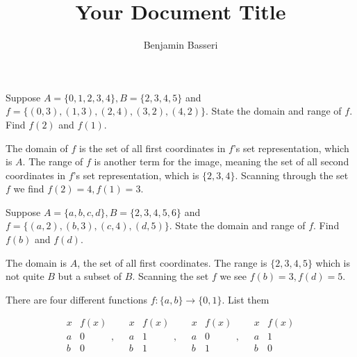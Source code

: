 \documentclass{article}
\title{Your Document Title}
\author{Benjamin Basseri}
\begin{document}
\maketitle

\begin{problem}
Suppose $A = \{0, 1, 2, 3, 4\}, B = \{2, 3, 4, 5\}$ and $f = \{(0, 3), (1, 3), (2, 4), (3, 2), (4, 2)\}$. State the domain and range of $f$. Find $f(2)$ and $f(1)$.
\end{problem}

The domain of $f$ is the set of all first coordinates in $f$'s set representation, which is $A$. The range of $f$ is another term for the image, meaning the set of all second coordinates in $f$'s set representation, which is $\{2, 3, 4\}$. Scanning through the set $f$ we find $f(2) = 4, f(1) = 3$.

\begin{problem}
Suppose $A = \{a, b, c, d\}, B = \{2, 3, 4, 5, 6\}$ and $f = \{(a, 2), (b, 3), (c, 4), (d, 5)\}$. State the domain and range of $f$. Find $f(b)$ and $f(d)$.
\end{problem}

The domain is $A$, the set of all first coordinates. The range is $\{2, 3, 4, 5\}$ which is not quite $B$ but a subset of $B$. Scanning the set $f$ we see $f(b) = 3, f(d) = 5$.

\begin{problem}
There are four different functions $f: \{a, b\} \to \{0, 1\}$. List them
\end{problem}
$$\begin{array}{c|c}
    x & f(x) \\
    \hline
    a & 0    \\
    b & 0    \\
  \end{array}, \quad
  \begin{array}{c|c}
    x & f(x) \\
    \hline
    a & 1    \\
    b & 1    \\
  \end{array}, \quad
  \begin{array}{c|c}
    x & f(x) \\
    \hline
    a & 0    \\
    b & 1    \\
  \end{array}, \quad
  \begin{array}{c|c}
    x & f(x) \\
    \hline
    a & 1    \\
    b & 0    \\
  \end{array}
$$
\end{document}

